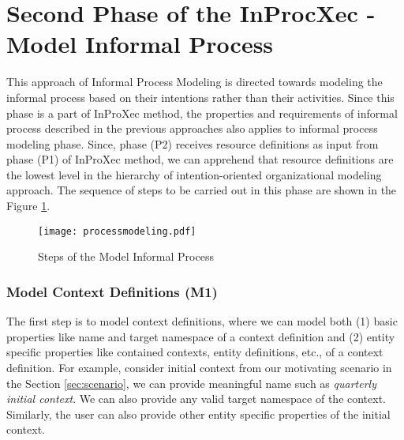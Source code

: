 \section{Second Phase of the InProcXec - Model Informal Process}
\label{sec:informalprocessmodeling}
This approach of Informal Process Modeling is directed towards modeling the informal process based on their intentions rather than their activities. Since this phase is a part of InProXec method, the properties and requirements of informal process described in the previous approaches \cite{Sungur2014a,Sungur2015} also applies to informal process modeling phase. Since, phase (P2) receives resource definitions as input from phase (P1) of InProXec method, we can apprehend that resource definitions are the lowest level in the hierarchy of intention-oriented organizational modeling approach. The sequence of steps to be carried out in this phase are shown in the Figure \ref{fig:processdiagram}. 

\begin{figure}
	\centering
	\texttt{[image: processmodeling.pdf]}
	\caption{Steps of the Model Informal Process}
	\label{fig:processdiagram}
\end{figure}

\subsubsection{Model Context Definitions (M1)}  
The first step is to model context definitions, where we can model both (1) basic properties like name and target namespace of a context definition and (2) entity specific properties like contained contexts, entity definitions, etc., of a context definition. For example, consider initial context from our motivating scenario in the Section \ref{sec:scenario}, we can provide meaningful name such as \textit{quarterly initial context}. We can also provide any valid target namespace of the context. Similarly, the user can also provide other entity specific properties of the initial context. 

